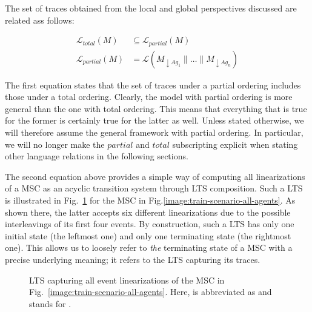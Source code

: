 The set of traces obtained from the local and global perspectives discussed are related ass follows:

\vspace{-0.5cm}
\begin{align}
\mathcal{L}_{total}(M) & \subseteq \mathcal{L}_{partial}(M) \\
\mathcal{L}_{partial}(M) &= \mathcal{L}(M_{\downarrow Ag_1} \parallel \ldots \parallel M_{\downarrow Ag_n})
\label{equation:msc-composition}
\end{align}

The first equation states that the set of traces under a partial ordering includes those under a total ordering. Clearly, the model with partial ordering is more general than the one with total ordering. This means that everything that is true for the former is certainly true for the latter as well. Unless stated otherwise, we will therefore assume the general framework with partial ordering. In particular, we will no longer make the $partial$ and $total$ subscripting explicit when stating other language relations in the following sections.

The second equation above provides a simple way of computing all linearizations of a MSC as an acyclic transition system through LTS composition. Such a LTS is illustrated in Fig.~\ref{image:msc-linearizations} for the MSC in Fig.\ref{image:train-scenario-all-agents}. As shown there, the latter accepts six different linearizations due to the possible interleavings of its first four events. By construction, such a LTS has only one initial state (the leftmost one) and only one terminating state (the rightmost one). This allows us to loosely refer to \emph{the} terminating state of a MSC with a precise underlying meaning; it refers to the LTS capturing its traces.


\begin{figure}\centering
{}
\caption{LTS capturing all event linearizations of the MSC in Fig.~\ref{image:train-scenario-all-agents}. Here,  is abbreviated as  and  stands for . \label{image:msc-linearizations}}
\end{figure}

